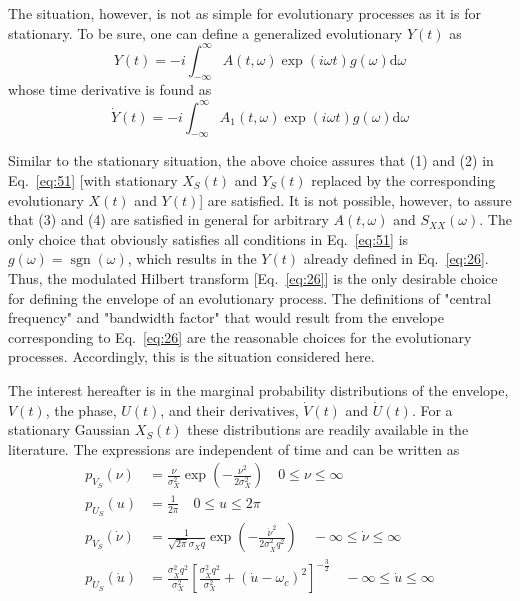 \documentclass[12pt]{article}
\begin{document}
The situation, however, is not as simple for evolutionary processes as it is for stationary. To be sure, one can define a generalized evolutionary $Y(t)$ as
\begin{equation}
Y(t)=-i \int_{-\infty}^{\infty} A(t, \omega) \exp (i \omega t) g(\omega) \mathrm{d} \omega
\label{eq:52}
\end{equation}
whose time derivative is found as
\begin{equation}
\dot{Y}(t)=-i \int_{-\infty}^{\infty} A_{1}(t, \omega) \exp (i \omega t) g(\omega) \mathrm{d} \omega
\label{eq:53}
\end{equation}

Similar to the stationary situation, the above choice assures that (1) and (2) in Eq.~\eqref{eq:51} [with stationary $X_{S}(t)$ and $Y_{S}(t)$ replaced by the corresponding evolutionary $X(t)$ and $Y(t)$] are satisfied. It is not possible, however, to assure that (3) and (4) are satisfied in general for arbitrary $A(t, \omega)$ and $S_{X X}(\omega)$. The only choice that obviously satisfies all conditions in Eq.~\eqref{eq:51} is $g(\omega)=\operatorname{sgn}(\omega)$, which results in the $Y(t)$ already defined in Eq.~\eqref{eq:26}. Thus, the modulated Hilbert transform [Eq.~\eqref{eq:26}] is the only desirable choice for defining the envelope of an evolutionary process. The definitions of "central frequency" and "bandwidth factor" that would result from the envelope corresponding to Eq.~\eqref{eq:26} are the reasonable choices for the evolutionary processes. Accordingly, this is the situation considered here.

The interest hereafter is in the marginal probability distributions of the envelope, $V(t)$, the phase, $U(t)$, and their derivatives, $\dot{V}(t)$ and $\dot{U}(t)$. For a stationary Gaussian $X_{S}(t)$ these distributions are readily available in the literature. The expressions are independent of time and can be written as~\cite{Sveshnikov1966}
\begin{align}
p_{V_{S}}(\nu) &=\frac{\nu}{\sigma_{X}^{2}} \exp \left(-\frac{\nu^{2}}{2 \sigma_{X}^{2}}\right) \quad 0 \leqslant \nu \leqslant \infty \label{eq:54} \\
p_{U_{S}}(u) &=\frac{1}{2 \pi} \quad 0 \leqslant u \leqslant 2 \pi \label{eq:55} \\
p_{\dot{V}_{S}}(\dot{\nu}) &=\frac{1}{\sqrt{2 \pi} \sigma_{\dot{X}} q} \exp \left(-\frac{\dot{\nu}^{2}}{2 \sigma_{\dot{X}}^{2} q^{2}}\right) \quad-\infty \leqslant \dot{\nu} \leqslant \infty \label{eq:56} \\
p_{\dot{U}_{S}}(\dot{u}) &=\frac{\sigma_{\dot{X}}^{2} q^{2}}{\sigma_{X}^{2}}\left[\frac{\sigma_{\dot{X}}^{2} q^{2}}{\sigma_{X}^{2}}+\left(\dot{u}-\omega_{c}\right)^{2}\right]^{-\frac{3}{2}} \quad-\infty \leqslant \dot{u} \leqslant \infty \label{eq:57}
\end{align}
\end{document}
